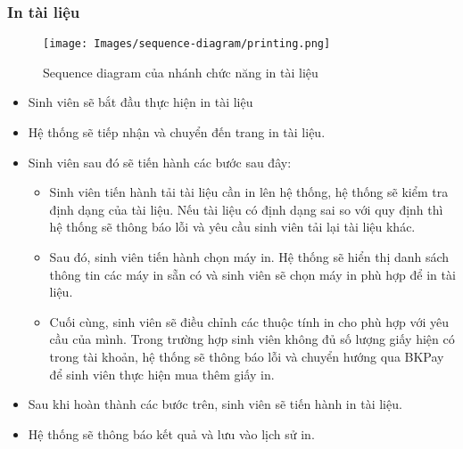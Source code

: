 \subsubsection{In tài liệu}
\begin{figure}[H]
    \centering
    \texttt{[image: Images/sequence-diagram/printing.png]}
    \vspace{0.1cm}
    \caption{Sequence diagram của nhánh chức năng in tài liệu}
\end{figure}
\begin{itemize}
\item Sinh viên sẽ bắt đầu thực hiện in tài liệu
\item Hệ thống sẽ tiếp nhận và chuyển đến trang in tài liệu.
\item Sinh viên sau đó sẽ tiến hành các bước sau đây:
\begin{itemize}
\item Sinh viên tiến hành tải tài liệu cần in lên hệ thống, hệ thống sẽ kiểm tra định dạng của tài liệu. Nếu tài liệu có định dạng sai so với quy định thì hệ thống sẽ thông báo lỗi và yêu cầu sinh viên tải lại tài liệu khác.
\item Sau đó, sinh viên tiến hành chọn máy in. Hệ thống sẽ hiển thị danh sách thông tin các máy in sẵn có và sinh viên sẽ chọn máy in phù hợp để in tài liệu.
\item Cuối cùng, sinh viên sẽ điều chỉnh các thuộc tính in cho phù hợp với yêu cầu của mình. Trong trường hợp sinh viên không đủ số lượng giấy hiện có trong tài khoản, hệ thống sẽ thông báo lỗi và chuyển hướng qua BKPay để sinh viên thực hiện mua thêm giấy in.
\end{itemize}
\item Sau khi hoàn thành các bước trên, sinh viên sẽ tiến hành in tài liệu.
\item Hệ thống sẽ thông báo kết quả và lưu vào lịch sử in.
\end{itemize}

